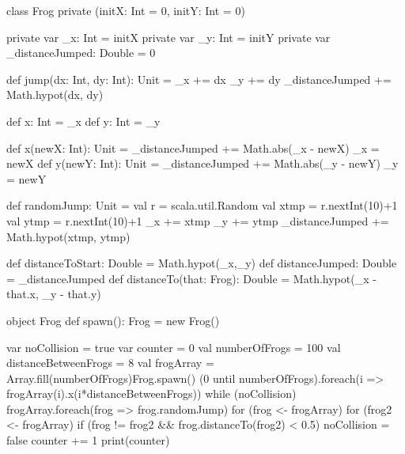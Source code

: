 \Subtask \begin{CodeSmall}
class Frog private (initX: Int = 0, initY: Int = 0) {
	private var _x: Int = initX
	private var _y: Int = initY
	private var _distanceJumped: Double = 0
	
	def jump(dx: Int, dy: Int): Unit = {
		_x += dx
		_y += dy
		_distanceJumped += Math.hypot(dx, dy)
	}
	
	def x: Int = _x
	def y: Int = _y
	
	def x(newX: Int): Unit = {
		_distanceJumped += Math.abs(_x - newX)
		_x = newX
	} 
	def y(newY: Int): Unit = {
		_distanceJumped += Math.abs(_y - newY)
		_y = newY
	} 
	
	def randomJump: Unit = {
		val r = scala.util.Random
		val xtmp = r.nextInt(10)+1
		val ytmp = r.nextInt(10)+1
		_x += xtmp
		_y += ytmp
		_distanceJumped += Math.hypot(xtmp, ytmp)
	}
	
	def distanceToStart: Double = Math.hypot(_x,_y)
	def distanceJumped: Double = _distanceJumped
	def distanceTo(that: Frog): Double = Math.hypot(_x - that.x, _y - that.y)
}

object Frog {
	def spawn(): Frog = new Frog()
}
\end{CodeSmall}

\Subtask \begin{CodeSmall}
var noCollision = true
var counter = 0
val numberOfFrogs = 100
val distanceBetweenFrogs = 8
val frogArray = Array.fill(numberOfFrogs){Frog.spawn()}
(0 until numberOfFrogs).foreach(i => frogArray(i).x(i*distanceBetweenFrogs))
while (noCollision) {
	frogArray.foreach(frog => frog.randomJump)
	for (frog <- frogArray) {
		for (frog2 <- frogArray) {
			if (frog != frog2 && frog.distanceTo(frog2) < 0.5) {
				noCollision = false
			}
		}
	}
	counter += 1
} 
print(counter)
\end{CodeSmall}


\clearpage

\ExtraTasks %

\Task 

\vspace{1em} %

